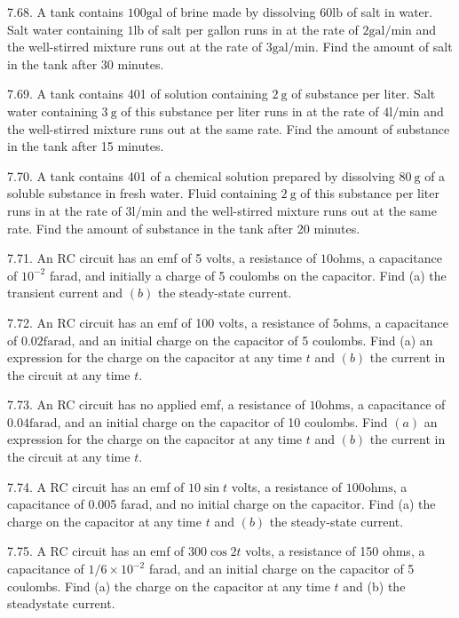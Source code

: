 \documentclass[10pt]{article}
\begin{document}
7.68. A tank contains $100 \mathrm{gal}$ of brine made by dissolving $60 \mathrm{lb}$ of salt in water. Salt water containing $1 \mathrm{lb}$ of salt per gallon runs in at the rate of $2 \mathrm{gal} / \mathrm{min}$ and the well-stirred mixture runs out at the rate of $3 \mathrm{gal} / \mathrm{min}$. Find the amount of salt in the tank after 30 minutes.

7.69. A tank contains 401 of solution containing $2 \mathrm{~g}$ of substance per liter. Salt water containing $3 \mathrm{~g}$ of this substance per liter runs in at the rate of $4 \mathrm{l} / \mathrm{min}$ and the well-stirred mixture runs out at the same rate. Find the amount of substance in the tank after 15 minutes.

7.70. A tank contains 401 of a chemical solution prepared by dissolving $80 \mathrm{~g}$ of a soluble substance in fresh water. Fluid containing $2 \mathrm{~g}$ of this substance per liter runs in at the rate of $3 \mathrm{l} / \mathrm{min}$ and the well-stirred mixture runs out at the same rate. Find the amount of substance in the tank after 20 minutes.

7.71. An $\mathrm{RC}$ circuit has an emf of 5 volts, a resistance of $10 \mathrm{ohms}$, a capacitance of $10^{-2}$ farad, and initially a charge of 5 coulombs on the capacitor. Find (a) the transient current and $(b)$ the steady-state current.

7.72. An $\mathrm{RC}$ circuit has an emf of 100 volts, a resistance of $5 \mathrm{ohms}$, a capacitance of $0.02 \mathrm{farad}$, and an initial charge on the capacitor of 5 coulombs. Find (a) an expression for the charge on the capacitor at any time $t$ and $(b)$ the current in the circuit at any time $t$.

7.73. An RC circuit has no applied emf, a resistance of $10 \mathrm{ohms}$, a capacitance of $0.04 \mathrm{farad}$, and an initial charge on the capacitor of 10 coulombs. Find $(a)$ an expression for the charge on the capacitor at any time $t$ and $(b)$ the current in the circuit at any time $t$.

7.74. A RC circuit has an emf of $10 \sin t$ volts, a resistance of $100 \mathrm{ohms}$, a capacitance of 0.005 farad, and no initial charge on the capacitor. Find (a) the charge on the capacitor at any time $t$ and $(b)$ the steady-state current.

7.75. A RC circuit has an emf of $300 \cos 2 t$ volts, a resistance of 150 ohms, a capacitance of $1 / 6 \times 10^{-2}$ farad, and an initial charge on the capacitor of 5 coulombs. Find (a) the charge on the capacitor at any time $t$ and (b) the steadystate current.
\end{document}

